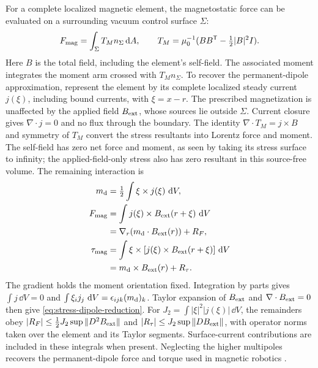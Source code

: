 For a complete localized magnetic element, the magnetostatic force
can be evaluated on a surrounding vacuum control surface $\Sigma$:
\begin{equation}
 F_{\rm mag}=\int_\Sigma T_Mn_\Sigma\,\mathrm d A,\qquad
 T_M=\mu_0^{-1}(BB^{\mathsf T}-\tfrac12|B|^2I).
\end{equation}
Here $B$ is the total field, including the element's self-field.
The associated moment integrates the moment arm crossed with
$T_Mn_\Sigma$. To recover the permanent-dipole approximation, represent
the element by its complete localized steady current $j(\xi)$,
including bound currents, with $\xi=x-r$. The prescribed magnetization
is unaffected by the applied field $B_{\rm ext}$, whose sources lie
outside $\Sigma$. Current closure gives $\nabla\cdot j=0$ and no flux
through the boundary. The identity $\nabla\cdot T_M=j\times B$ and
symmetry of $T_M$ convert the stress resultants into Lorentz force and
moment. The self-field has zero net force and moment, as seen by taking
its stress surface to infinity; the applied-field-only stress also has
zero resultant in this source-free volume. The remaining interaction is
\begin{equation}
\begin{aligned}
 m_{\rm d}&=\tfrac12\int\xi\times j(\xi)\,\,\mathrm d V,\\
 F_{\rm mag}&=\int j(\xi)\times B_{\rm ext}(r+\xi)\,\,\mathrm d V\\
 &=\nabla_r\!\left(m_{\rm d}\cdot B_{\rm ext}(r)\right)+R_F,\\
 \tau_{\rm mag}&=\int\xi\times[j(\xi)\times B_{\rm ext}(r+\xi)]\,\,\mathrm d V\\
 &=m_{\rm d}\times B_{\rm ext}(r)+R_\tau .
\end{aligned}
\label{eq:stress-dipole-reduction}
\end{equation}
The gradient holds the moment orientation fixed.
Integration by parts gives $\int j\,\dd V=0$ and
$\int\xi_i j_j\,\,\mathrm d V=\epsilon_{ijk}(m_{\rm d})_k$.
Taylor expansion of $B_{\rm ext}$ and $\nabla\cdot B_{\rm ext}=0$
then give \eqref{eq:stress-dipole-reduction}.
For $J_2=\int|\xi|^2|j(\xi)|\,\dd V$, the remainders obey
$|R_F|\le\tfrac12J_2\sup\|D^2B_{\rm ext}\|$ and
$|R_\tau|\le J_2\sup\|DB_{\rm ext}\|$, with operator norms taken over
the element and its Taylor segments. Surface-current contributions are
included in these integrals when present. Neglecting the higher
multipoles recovers the permanent-dipole force and torque used in
magnetic robotics \citep[Section~4.1, Eqs.~(12) and~(16)]{abbott}.

